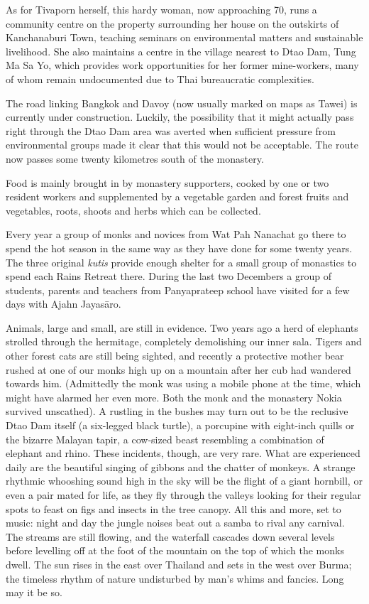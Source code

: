 As for Tivaporn herself, this hardy woman, now approaching 70, runs a
community centre on the property surrounding her house on the outskirts
of Kanchanaburi Town, teaching seminars on environmental matters and
sustainable livelihood. She also maintains a centre in the village
nearest to Dtao Dam, Tung Ma Sa Yo, which provides work opportunities
for her former mine-workers, many of whom remain undocumented due to
Thai bureaucratic complexities.

The road linking Bangkok and Davoy (now usually marked on maps as Tawei)
is currently under construction. Luckily, the possibility that it might
actually pass right through the Dtao Dam area was averted when
sufficient pressure from environmental groups made it clear that this
would not be acceptable. The route now passes some twenty kilometres
south of the monastery.

Food is mainly brought in by monastery supporters, cooked by one or two
resident workers and supplemented by a vegetable garden and forest
fruits and vegetables, roots, shoots and herbs which can be collected.

Every year a group of monks and novices from Wat Pah Nanachat go there
to spend the hot season in the same way as they have done for some
twenty years. The three original \emph{kutis} provide enough shelter for
a small group of monastics to spend each Rains Retreat there. During the
last two Decembers a group of students, parents and teachers from
Panyaprateep school have visited for a few days with Ajahn Jayasāro.

Animals, large and small, are still in evidence. Two years ago a herd of
elephants strolled through the hermitage, completely demolishing our
inner sala. Tigers and other forest cats are still being sighted, and
recently a protective mother bear rushed at one of our monks high up on
a mountain after her cub had wandered towards him. (Admittedly the monk
was using a mobile phone at the time, which might have alarmed her even
more. Both the monk and the monastery Nokia survived unscathed). A
rustling in the bushes may turn out to be the reclusive Dtao Dam itself
(a six-legged black turtle), a porcupine with eight-inch quills or the
bizarre Malayan tapir, a cow-sized beast resembling a combination of
elephant and rhino. These incidents, though, are very rare. What are
experienced daily are the beautiful singing of gibbons and the chatter
of monkeys. A strange rhythmic whooshing sound high in the sky will be
the flight of a giant hornbill, or even a pair mated for life, as they
fly through the valleys looking for their regular spots to feast on figs
and insects in the tree canopy. All this and more, set to music: night
and day the jungle noises beat out a samba to rival any carnival. The
streams are still flowing, and the waterfall cascades down several
levels before levelling off at the foot of the mountain on the top of
which the monks dwell. The sun rises in the east over Thailand and sets
in the west over Burma; the timeless rhythm of nature undisturbed by
man's whims and fancies. Long may it be so.

